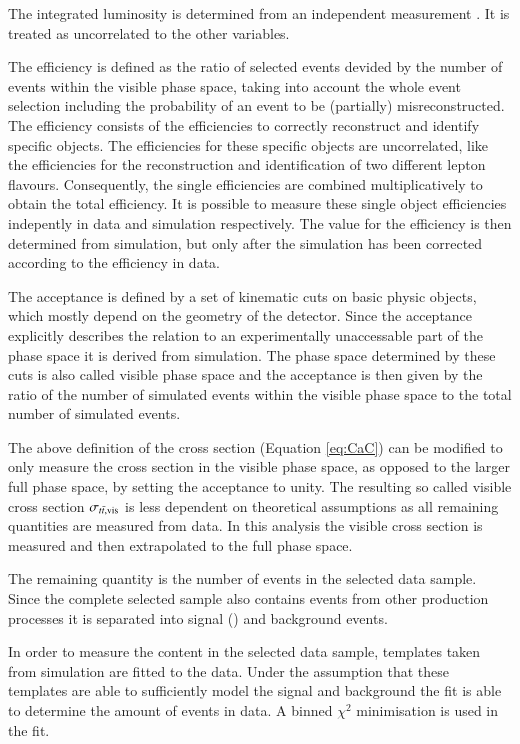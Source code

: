 The integrated luminosity is determined from an independent measurement \cite{CMS-PAS-LUM-17-001}. It is treated as uncorrelated to the other variables.

The efficiency is defined as the ratio of selected \ttbar events devided by the number of \ttbar events within the visible phase space, taking into account the whole event selection including the probability of an event to be (partially) misreconstructed. The efficiency consists of the efficiencies to correctly reconstruct and identify specific objects. The efficiencies for these specific objects are uncorrelated, like the
efficiencies for the reconstruction and identification of two different lepton flavours. Consequently, the single efficiencies are combined multiplicatively to obtain the total efficiency.
It is possible to measure these single object efficiencies indepently in data and simulation respectively.
The value for the efficiency is then determined from simulation, but only after the simulation has been corrected according to the efficiency in data.

The acceptance is defined by a set of kinematic cuts on basic physic objects, which mostly depend on the geometry of the detector.
Since the acceptance explicitly describes the relation to an experimentally unaccessable part of the phase space it is derived from simulation.
The phase space determined by these cuts is also called visible phase space and the acceptance is then given by the ratio of the number of simulated \ttbar events within the visible phase space to the total number of simulated \ttbar events. 

The above definition of the cross section (Equation \ref{eq:CaC}) can be modified to only measure the cross section in the visible phase space, as opposed to the larger full phase space, by setting the 
acceptance to unity. The resulting so called visible cross section $\sigma_{t\bar{t},\mathrm{vis}}$ is less dependent on theoretical assumptions as all remaining quantities are measured from data.
In this analysis the visible cross section is measured and then extrapolated to the full phase space.

The remaining quantity is the number of \ttbar events in the selected data sample. Since the complete selected sample also contains events from other production processes it is separated into
signal (\ttbar) and background events. 

In order to measure the \ttbar content in the selected data sample, templates taken from simulation are fitted to the data. Under the assumption that these templates are able to sufficiently 
model the signal and background the fit is able to determine the amount of \ttbar events in data.
A binned $\chi^2$ minimisation is used in the fit.

